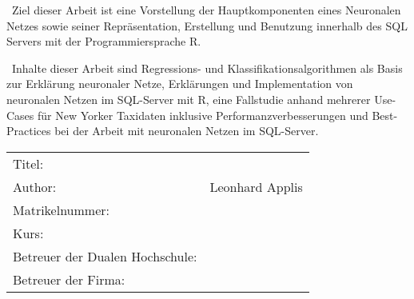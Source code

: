 ~\newline Ziel dieser Arbeit ist eine Vorstellung der Hauptkomponenten eines Neuronalen Netzes sowie seiner Repräsentation, Erstellung und Benutzung innerhalb des SQL Servers mit der Programmiersprache R.  

~\newline Inhalte dieser Arbeit sind Regressions- und Klassifikationsalgorithmen als Basis zur Erklärung neuronaler Netze, Erklärungen und Implementation von neuronalen Netzen im SQL-Server mit R, eine Fallstudie anhand mehrerer Use-Cases für New Yorker Taxidaten inklusive Performanzverbesserungen und Best-Practices bei der Arbeit mit neuronalen Netzen im SQL-Server.
~\newline
~\newline
\begin{flushleft}
	\begin{tabular}{ll}
		Titel:& \quad \titel \\ 
		Author:& \quad Leonhard Applis \\
		Matrikelnummer: & \quad \matrikelnr  \\
		Kurs: & \quad \kurs \\ 
		Betreuer der Dualen Hochschule: & \quad \betreuerdhbw \\ 
		Betreuer der Firma: & \quad \betreuerfirma \\
		[6ex]%
	\end{tabular} 
\end{flushleft}